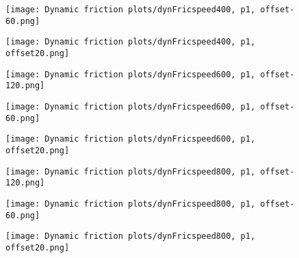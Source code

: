 \documentclass[12pt]{article}
\begin{document}
\begin{figure}[!h]
    \centering
    \begin{minipage}{0.49\textwidth}       
         \texttt{[image: Dynamic friction plots/dynFricspeed400, p1, offset-60.png]}
    \end{minipage}
    \begin{minipage}{0.49\textwidth}       
         \texttt{[image: Dynamic friction plots/dynFricspeed400, p1, offset20.png]}
    \end{minipage}

\end{figure}
\begin{figure}[!h]
    \centering
    \begin{minipage}{0.49\textwidth}       
         \texttt{[image: Dynamic friction plots/dynFricspeed600, p1, offset-120.png]}
    \end{minipage}
    \begin{minipage}{0.49\textwidth}       
         \texttt{[image: Dynamic friction plots/dynFricspeed600, p1, offset-60.png]}
    \end{minipage}

\end{figure}
\begin{figure}[!h]
    \centering
    \begin{minipage}{0.49\textwidth}       
         \texttt{[image: Dynamic friction plots/dynFricspeed600, p1, offset20.png]}
    \end{minipage}
    \begin{minipage}{0.49\textwidth}       
         \texttt{[image: Dynamic friction plots/dynFricspeed800, p1, offset-120.png]}
    \end{minipage}

\end{figure}
\begin{figure}[!h]
    \centering
    \begin{minipage}{0.49\textwidth}       
         \texttt{[image: Dynamic friction plots/dynFricspeed800, p1, offset-60.png]}
    \end{minipage}
    \begin{minipage}{0.49\textwidth}       
         \texttt{[image: Dynamic friction plots/dynFricspeed800, p1, offset20.png]}
    \end{minipage}

\end{figure}
\end{document}
